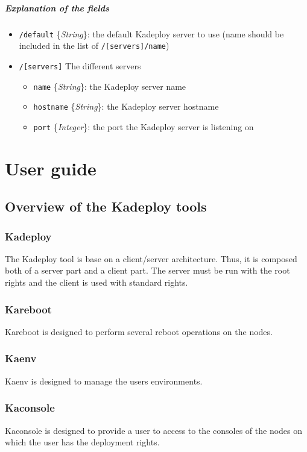\documentclass[a4wide,10pt,oneside]{book}
\newcommand{\ypath}[1]{\texttt{#1}}
\newcommand{\yfield}[2]{\texttt{#1} {\small\{{\emph{#2}}\}}:}
\begin{document}
\paragraph{Explanation of the fields\\}
\begin{itemize}
  \item \yfield{\ypath{/default}}{String} the default Kadeploy server to use (name should be included in the list of \ypath{/[servers]/name})
  \item \ypath{/[servers]} The different servers
  \begin{itemize}
    \item \yfield{name}{String} the Kadeploy server name
    \item \yfield{hostname}{String} the Kadeploy server hostname
    \item \yfield{port}{Integer} the port the Kadeploy server is listening on
  \end{itemize}
\end{itemize}

\chapter{User guide}\label{chap:User_guide}

\section{Overview of the Kadeploy tools}
\subsection{Kadeploy}
The Kadeploy tool is base on a client/server architecture. Thus, it is composed both of a server part and a client part. The server must be run with the root rights and the client is used with standard rights.

\subsection{Kareboot}
Kareboot is designed to perform several reboot operations on the nodes.

\subsection{Kaenv}
Kaenv is designed to manage the users environments.

\subsection{Kaconsole}
Kaconsole is designed to provide a user to access to the consoles of the nodes on which the user has the deployment rights.
\end{document}

